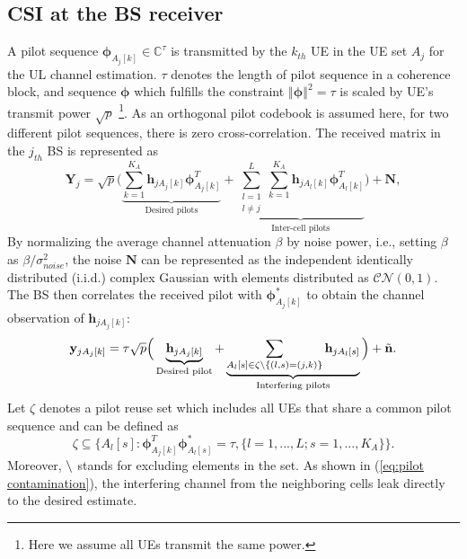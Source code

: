 \subsection{CSI at the BS receiver}
A pilot sequence $\mathbf{\phi}_{A_j[k]}\in \mathbb{C}^{\tau} $ is transmitted by the $k_{th}$ UE in the UE set $A_j$ for the UL channel estimation. $\tau$ denotes the length of pilot sequence in a coherence block, and sequence $\mathbf{{\phi}}$ which fulfills the constraint $\left\Vert\mathbf{\phi}\right\Vert^2=\tau$ is scaled by UE's transmit power $\sqrt{p}$ \footnote{Here we assume all UEs transmit the same power. }. As an orthogonal pilot codebook is assumed here, for two different pilot sequences, there is zero cross-correlation.  The received matrix in the $j_{th}$ BS is represented as 
\begin{equation} \label{eq:Yj}
\mathbf{Y}_j = \sqrt{p}\Big(\underbrace{\sum_{k = 1}^{K_A} \mathbf{h}_{jA_j[k]} \mathbf{\phi}_{A_j[k]}^T}_\text{Desired pilots} +\underbrace{\sum_{\substack{l=1 \\ l\neq j}}^{L}\sum_{k = 1}^{K_A} \mathbf{h}_{jA_l[k]} \mathbf{\phi}_{A_l[k]}^T}_\text{Inter-cell pilots}\Big) + \mathbf{N},   
\end{equation}
By normalizing the average channel attenuation $\beta$ by noise power, i.e., setting $\beta$ as $\beta/\sigma^2_{noise}$, the noise $\mathbf{N}$ can be represented as the independent identically distributed
(i.i.d.) complex Gaussian with elements distributed as $\mathcal{CN\left(\mathit{0,1}\right)}$.
The BS then correlates the received pilot with $\mathbf{\phi}_{A_j[k]}^*$ to obtain the channel observation of $\mathbf{h}_{jA_j[k]}$:%
\begin{equation} 
\mathbf{y}_{jA_j[k]} = \tau\sqrt{p}\Big(\underbrace{\mathbf{h}_{jA_j[k]}}_\text{Desired pilot} +\underbrace{\sum_{A_l[s]\in \\ \zeta\char`\\\{(l,s) = (j,k)\}}\mathbf{h}_{jA_l[s]}}_\text{Interfering pilots}\Big) + \tilde{\mathbf{n}}.   \label{eq:pilot contamination}
\end{equation}
Let $\zeta$ denotes a pilot reuse set which includes all UEs that share a common pilot sequence and can be defined as
\begin{equation}
\zeta \subseteq \{A_l[s]:\mathbf{\phi}_{A_j[k]}^T \mathbf{\phi}_{A_l[s]}^*=\tau, \{l=1,...,L;s=1,...,K_A\}\}.
\end{equation}
Moreover, $\char`\\$ stands for excluding elements in the set. As shown in (\ref{eq:pilot contamination}), the interfering channel from the neighboring cells leak directly to the desired estimate.

